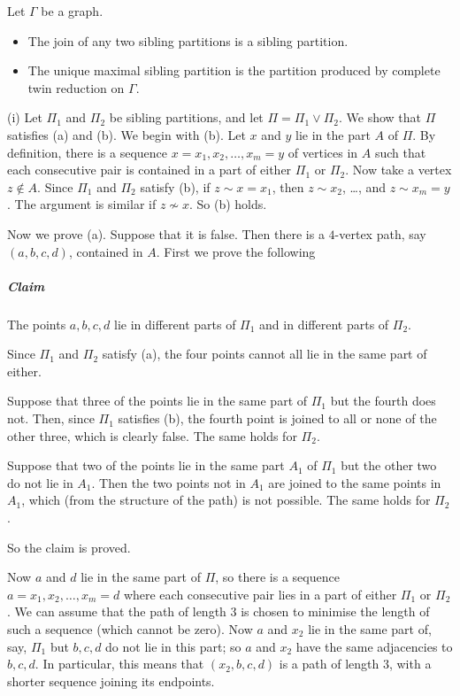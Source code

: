 \documentclass[10pt,a4paper]{amsart}
\newenvironment{proof}{\prepf\rm}{\endprepf}
\begin{document}
\begin{theorem}
Let $\Gamma$ be a graph.
\begin{itemize}
\item[(i)] The join of any two sibling partitions is a sibling partition.
\item[(ii)] The unique maximal sibling partition is the partition produced by
complete twin reduction on $\Gamma$.
\end{itemize}
\end{theorem}

\begin{proof} (i) Let $\Pi_1$ and $\Pi_2$ be sibling partitions, and let
$\Pi=\Pi_1\vee\Pi_2$. We show that $\Pi$ satisfies (a) and (b). We begin
with (b). Let $x$ and $y$ lie in the part $A$ of $\Pi$. By definition, there
is a sequence $x=x_1,x_2,\ldots,x_m=y$ of vertices in $A$ such that each
consecutive pair is contained in a part of either $\Pi_1$ or $\Pi_2$. Now
take a vertex $z\notin A$. Since $\Pi_1$ and $\Pi_2$ satisfy (b), if
$z\sim x=x_1$, then $z\sim x_2$, \dots, and $z\sim x_m=y$. The argument is
similar if $z\not\sim x$. So (b) holds.

\smallskip

Now we prove (a). Suppose that it is false. Then there is a $4$-vertex path,
say $(a,b,c,d)$, contained in $A$. First we prove the following

\subparagraph{Claim} The points $a,b,c,d$ lie in different parts of $\Pi_1$ and
in different parts of $\Pi_2$.

Since $\Pi_1$ and $\Pi_2$ satisfy (a), the four points cannot all lie in the
same part of either.

Suppose that three of the points lie in the same part of $\Pi_1$ but the fourth
does not. Then, since $\Pi_1$ satisfies (b), the fourth point is joined to all
or none of the other three, which is clearly false. The same holds for $\Pi_2$.

Suppose that two of the points lie in the same part $A_1$ of $\Pi_1$ but the
other two do not lie in $A_1$. Then the two points not in $A_1$ are joined to
the same points in $A_1$, which (from the structure of the path) is not
possible. The same holds for $\Pi_2$. 

So the claim is proved.

\smallskip

Now $a$ and $d$ lie in the same part of $\Pi$, so there is a sequence
$a=x_1,x_2,\ldots,x_m=d$ where each consecutive pair lies in a part of
either $\Pi_1$ or $\Pi_2$. We can assume that the path of length $3$ is
chosen to minimise the length of such a sequence (which cannot be zero).
Now $a$ and $x_2$ lie in the same part of, say, $\Pi_1$ but $b,c,d$ do not
lie in this part; so $a$ and $x_2$ have the same adjacencies to $b,c,d$.
In particular, this means that $(x_2,b,c,d)$ is a path of length $3$, with
a shorter sequence joining its endpoints.


\end{proof}
\end{document}
